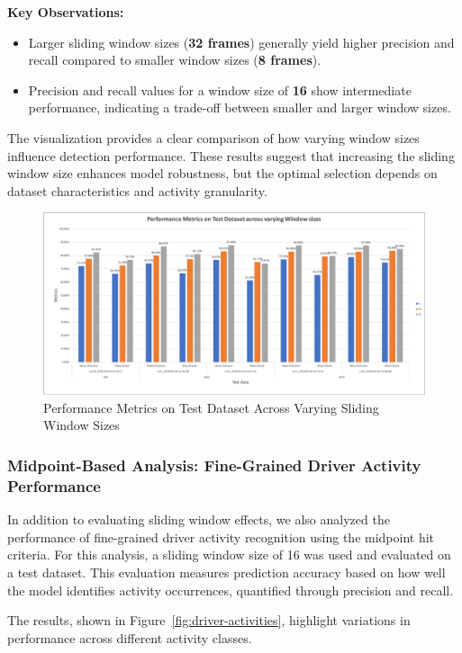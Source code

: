 \documentclass{article}
\begin{document}
\textbf{Key Observations:}
\begin{itemize}
    \item Larger sliding window sizes (\textbf{32 frames}) generally yield higher precision and recall compared to smaller window sizes (\textbf{8 frames}).
    \item Precision and recall values for a window size of \textbf{16} show intermediate performance, indicating a trade-off between smaller and larger window sizes.
\end{itemize}

The visualization provides a clear comparison of how varying window sizes influence detection performance. These results suggest that increasing the sliding window size enhances model robustness, but the optimal selection depends on dataset characteristics and activity granularity.

\begin{figure}[h]
    \centering
    \includegraphics[width=\linewidth]{Latex Files/figs/metrics.png}
    \caption{ Performance Metrics on Test Dataset Across Varying Sliding Window Sizes}
    \label{fig:metrics}
\end{figure}

\subsubsection{Midpoint-Based Analysis: Fine-Grained Driver Activity Performance}

In addition to evaluating sliding window effects, we also analyzed the performance of fine-grained driver activity recognition using the midpoint hit criteria. For this analysis, a sliding window size of 16 was used and evaluated on a test dataset.
This evaluation measures prediction accuracy based on how well the model identifies activity occurrences, quantified through precision and recall.

The results, shown in Figure~\ref{fig:driver-activities}, highlight variations in performance across different activity classes.
\end{document}
